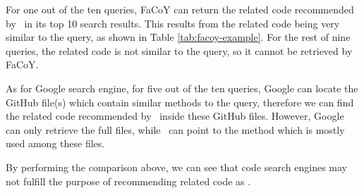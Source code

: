 For one out of the ten queries, {\ttt FaCoY} can return the related code recommended by \tool\ in its top 10 search results. This results from the related code being very similar to the query, as shown in Table \ref{tab:facoy-example}. For the rest of nine queries, the related code is not similar to the query, so it cannot be retrieved by {\ttt FaCoY}.

As for Google search engine, for five out of the ten queries, Google can locate the GitHub file(s) which contain similar methods to the query, therefore we can find the related code recommended by \tool\ inside these GitHub files. However, Google can only retrieve the full files, while \tool\ can point to the method which is mostly used among these files. 

By performing the comparison above, we can see that code search engines may not fulfill the purpose of recommending related code as \tool{}.
